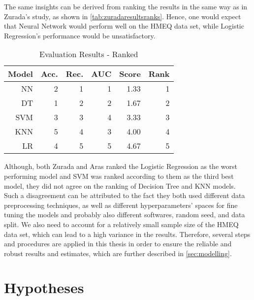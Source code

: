 The same insights can be derived from ranking the results in the same way as in Zurada's study, as shown in \autoref{tab:zuradaresultsranks}.
Hence, one would expect that Neural Network would perform well on the HMEQ data set, while Logistic Regression's performance would be unsatisfactory.
\begin{table}[H]
    \small
    \setlength{\tabcolsep}{8pt}
    \renewcommand{\arraystretch}{1.3}
    \centering
    \caption[Evaluation Results - Ranked \citep{zurada2014classification}]{Evaluation Results - Ranked \citep{zurada2014classification}}\label{tab:zuradaresultsranks}
    \begin{tabular}{r r r r r r}
    \toprule
    \textbf{Model} & \textbf{Acc.} & \textbf{Rec.} & \textbf{AUC} & \textbf{Score} & \textbf{Rank} \\
    \midrule
    \hline
    NN & 2 & 1 & 1 & 1.33 & 1 \\ 
    DT & 1 & 2 & 2 & 1.67 & 2 \\ 
    SVM & 3 & 3 & 4 & 3.33 & 3 \\ 
    KNN & 5 & 4 & 3 & 4.00 & 4 \\ 
    LR & 4 & 5 & 5 & 4.67 & 5 \\ 
    \hline
    \bottomrule
    \end{tabular}
    \vspace{0.35em}
    
    \vspace{-1em}
\end{table}

Although, both Zurada and Aras ranked the Logistic Regression as the worst performing model and SVM was ranked according to them as the third best model, they did not agree on the ranking of Decision Tree and KNN models.
Such a disagreement can be attributed to the fact they both used different data preprocessing techniques, as well as different hyperparameters' spaces for fine tuning the models and probably also different softwares, random seed, and data split.
We also need to account for a relatively small sample size of the HMEQ data set, which can lead to a high variance in the results.
Therefore, several steps and procedures are applied in this thesis in order to ensure the reliable and robust results and estimates, which are further described in \autoref{sec:modelling}.

\section{Hypotheses}

